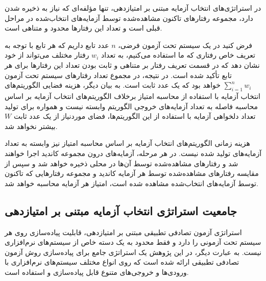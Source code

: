 در استراتژی‌های انتخاب آزمایه مبتنی بر امتیازدهی، تنها مؤلفه‌ای که نیاز به ذخیره شدن دارد، مجموعه رفتارهای تاکنون مشاهده‌شده توسط آزمایه‌های انتخاب‌شده در مراحل قبلی است و تعداد این رفتارها محدود و متناهی است.

فرض کنید در یک سیستم تحت آزمون فرضی، $n$ عدد تابع داریم که هر تابع با توجه به تعریف خاص رفتاری که ما استفاده می‌کنیم، به تعداد $w_i$ رفتار مختلف می‌تواند از خود نشان دهد که در قسمت تعریف رفتار بر متناهی و ثابت بودن تعداد این رفتارها برای هر تابع تأکید شده است. در نتیجه، در مجموع تعداد رفتارهای سیستم تحت آزمون $\sum_{i=1}^{n} w_i$ خواهد بود که یک عدد ثابت است. به بیان دیگر، هزینه فضایی الگوریتم‌های انتخاب آزمایه با استفاده از محاسبه امتیاز برخلاف الگوریتم‌های انتخاب آزمایه بر اساس محاسبه فاصله به تعداد آزمایه‌های خروجی الگوریتم وابسته نیست و همواره برای تولید تعداد دلخواهی آزمایه با استفاده از این الگوریتم‌ها، فضای موردنیاز از یک عدد ثابت $W$ بیشتر نخواهد شد.

هزینه زمانی الگوریتم‌های انتخاب آزمایه بر اساس محاسبه امتیاز نیز وابسته به تعداد آزمایه‌های تولید شده نیست. در هر مرحله، آزمایه‌های درون مجموعه کاندید اجرا خواهند شد و رفتارهای مشاهده‌شده توسط آن‌ها در محلی ذخیره خواهد شد و سپس از مقایسه رفتارهای مشاهده‌شده توسط هر آزمایه کاندید و مجموعه رفتارهایی که تاکنون توسط آزمایه‌های انتخاب‌شده مشاهده شده است، امتیاز هر آزمایه محاسبه خواهد شد.

\subsection{جامعیت استراتژی انتخاب آزمایه مبتنی بر امتیازدهی}

استراتژی آزمون تصادفی تطبیقی مبتنی بر امتیازدهی، قابلیت پیاده‌سازی روی هر سیستم تحت آزمونی را دارد و فقط محدود به یک دسته خاص از سیستم‌های نرم‌افزاری نیست. به عبارت دیگر، در این پژوهش یک استراتژی جامع برای پیاده‌سازی روش آزمون تصادفی تطبیقی ارائه شده است که روی انواع مختلف سیستم‌های نرم‌افزاری با ورودی‌ها و خروجی‌های متنوع قابل پیاده‌سازی و استفاده است.




